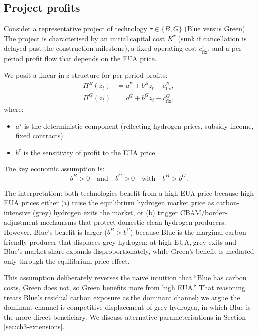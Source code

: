 \documentclass[11pt,a4paper]{article}
\newcommand{\PB}{\Pi^{B}}
\newcommand{\PG}{\Pi^{G}}
\begin{document}
\subsection{Project profits}

Consider a representative project of technology $\tau \in \{B, G\}$ (Blue versus Green). The project is characterised by an initial capital cost $K^{\tau}$ (sunk if cancellation is delayed past the construction milestone), a fixed operating cost $c^{\tau}_{\mathrm{fix}}$, and a per-period profit flow that depends on the EUA price.

We posit a linear-in-$z$ structure for per-period profits:
\begin{align}
\PB(z_t) &= a^B + b^B z_t - c^{B}_{\mathrm{fix}}, \\
\PG(z_t) &= a^G + b^G z_t - c^{G}_{\mathrm{fix}},
\end{align}
where:
\begin{itemize}
    \item $a^{\tau}$ is the deterministic component (reflecting hydrogen prices, subsidy income, fixed contracts);
    \item $b^{\tau}$ is the sensitivity of profit to the EUA price.
\end{itemize}

The key economic assumption is:
\begin{equation}
b^B > 0 \quad \text{and} \quad b^G > 0 \quad \text{with} \quad b^B > b^G.
\label{eq:ch3-key-assumption}
\end{equation}

The interpretation: both technologies benefit from a high EUA price because high EUA prices either (a) raise the equilibrium hydrogen market price as carbon-intensive (grey) hydrogen exits the market, or (b) trigger CBAM/border-adjustment mechanisms that protect domestic clean hydrogen producers. However, Blue's benefit is larger ($b^B > b^G$) because Blue is the marginal carbon-friendly producer that displaces grey hydrogen: at high EUA, grey exits and Blue's market share expands disproportionately, while Green's benefit is mediated only through the equilibrium price effect.

This assumption deliberately reverses the naïve intuition that ``Blue has carbon costs, Green does not, so Green benefits more from high EUA.'' That reasoning treats Blue's residual carbon exposure as the dominant channel; we argue the dominant channel is competitive displacement of grey hydrogen, in which Blue is the more direct beneficiary. We discuss alternative parameterisations in Section \ref{sec:ch3-extensions}.
\end{document}
